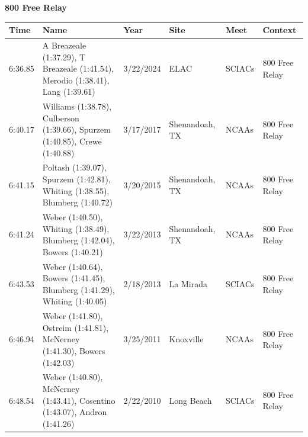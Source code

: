 \begin{table}[H]
\centering
\begin{minipage}[t]{0.6\textwidth}
\centering
\textbf{800 Free Relay}\\[0.1cm]
\begin{tabular}{@{}p{1.8cm}p{2.8cm}p{1.2cm}p{1.4cm}p{1.4cm}p{2.0cm}@{}}
\hline
    \textbf{Time} & \textbf{Name} & \textbf{Year} & \textbf{Site} & \textbf{Meet} & \textbf{Context} \\
\hline
    6:36.85 & A Breazeale (1:37.29), T Breazeale (1:41.54), Merodio (1:38.41), Lang (1:39.61) & 3/22/2024 & ELAC & SCIACs & 800 Free Relay \\
    6:40.17 & Williams (1:38.78), Culberson (1:39.66), Spurzem (1:40.85), Crewe (1:40.88) & 3/17/2017 & Shenandoah, TX & NCAAs & 800 Free Relay \\
    6:41.15 & Poltash (1:39.07), Spurzem (1:42.81), Whiting (1:38.55), Blumberg (1:40.72) & 3/20/2015 & Shenandoah, TX & NCAAs & 800 Free Relay \\
    6:41.24 & Weber (1:40.50), Whiting (1:38.49), Blumberg (1:42.04), Bowers (1:40.21) & 3/22/2013 & Shenandoah, TX & NCAAs & 800 Free Relay \\
    6:43.53 & Weber (1:40.64), Bowers (1:41.45), Blumberg (1:41.29), Whiting (1:40.05) & 2/18/2013 & La Mirada & SCIACs & 800 Free Relay \\
    6:46.94 & Weber (1:41.80), Ostreim (1:41.81), McNerney (1:41.30), Bowers (1:42.03) & 3/25/2011 & Knoxville & NCAAs & 800 Free Relay \\
    6:48.54 & Weber (1:40.80), McNerney (1:43.41), Cosentino (1:43.07), Andron (1:41.26) & 2/22/2010 & Long Beach & SCIACs & 800 Free Relay \\
\hline
\end{tabular}
\end{minipage}
\end{table}

